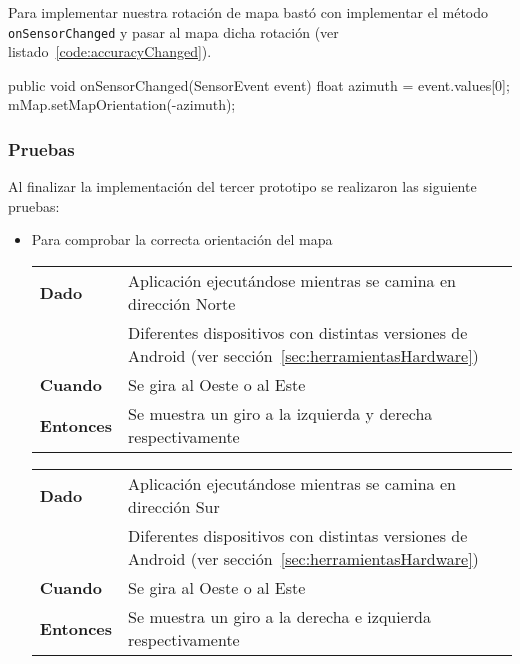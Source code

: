 Para implementar nuestra rotación de mapa bastó con implementar el método \texttt{onSensorChanged} y
pasar al mapa dicha rotación (ver listado~\ref{code:accuracyChanged}).

\begin{listing}[
  float=ht,
  language = java,
  caption  = {Ejemplo de rotación de mapa en función del sensor de orientación},
  label    = code:accuracyChanged]
public void onSensorChanged(SensorEvent event) {
    float azimuth = event.values[0];
    mMap.setMapOrientation(-azimuth);
}
\end{listing}

\subsubsection{Pruebas}

Al finalizar la implementación del tercer prototipo se realizaron las siguiente pruebas:

\begin{itemize}
  \item Para comprobar la correcta orientación del mapa

  \begin{tabular}{p{}p{}}
    \hline
    \textbf{Dado}     & Aplicación ejecutándose mientras se camina en dirección Norte \\
                      & Diferentes dispositivos con distintas versiones de Android (ver
                        sección~\ref{sec:herramientasHardware}) \\
    \textbf{Cuando}   & Se gira al Oeste o al Este \\
    \textbf{Entonces} & Se muestra un giro a la izquierda y derecha respectivamente \\
    \hline
  \end{tabular}

  \begin{tabular}{p{}p{}}
    \hline
    \textbf{Dado}     & Aplicación ejecutándose mientras se camina en dirección Sur \\
                      & Diferentes dispositivos con distintas versiones de Android (ver
                        sección~\ref{sec:herramientasHardware}) \\
    \textbf{Cuando}   & Se gira al Oeste o al Este \\
    \textbf{Entonces} & Se muestra un giro a la derecha e izquierda respectivamente \\
    \hline
  \end{tabular}
\end{itemize}

